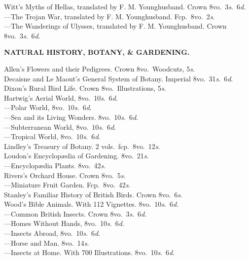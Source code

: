 \documentclass[letterpaper,12pt,oneside,openany]{memoir}
\newcommand{\E}{\hspace*{2mm}---\hspace*{2mm}}
\begin{document}
\begin{footnotesize}
Witt's Myths of Hellas, translated by F. M. Younghusband. Crown 8vo.\ 3\textit{s}.\ 6\textit{d}.\\
\E The Trojan War, translated by F. M. Younghusband. Fcp.\ 8vo.\ 2\textit{s}.\\
\E The Wanderings of Ulysses, translated by F. M. Younghusband. Crown 8vo.\ 3\textit{s}.\ 6\textit{d}.
\begin{center}
\textbf{NATURAL HISTORY, BOTANY, \& GARDENING.}
\end{center}
Allen's Flowers and their Pedigrees. Crown 8vo.\ Woodcuts, 5\textit{s}.\\
Decaisne and Le Maout's General System of Botany. Imperial 8vo.\ 31\textit{s}.\ 6\textit{d}.\\
Dixon's Rural Bird Life. Crown 8vo.\ Illustrations, 5\textit{s}.\\
Hartwig's Aerial World, 8vo.\ 10\textit{s}.\ 6\textit{d}.\\
\E  Polar World, 8vo.\ 10\textit{s}.\ 6\textit{d}.\\
\E  Sea and its Living Wonders. 8vo.\ 10\textit{s}.\ 6\textit{d}.\\
\E  Subterranean World, 8vo.\ 10\textit{s}.\ 6\textit{d}.\\
\E  Tropical World, 8vo.\ 10\textit{s}.\ 6\textit{d}.\\
Lindley's Treasury of Botany. 2 vols.\ fcp.\ 8vo.\ 12\textit{s}.\\
Loudon's Encyclop{\ae}dia of Gardening. 8vo.\ 21\textit{s}.\\
\E Encyclop{\ae}dia Plants. 8vo.\ 42\textit{s}.\\
Rivers's Orchard House. Crown 8vo.\ 5\textit{s}.\\
\E Miniature Fruit Garden. Fcp.\ 8vo.\ 42\textit{s}.\\
Stanley's Familiar History of British Birds. Crown 8vo.\ 6\textit{s}.\\
Wood's Bible Animals. With 112 Vignettes. 8vo.\ 10\textit{s}.\ 6\textit{d}.\\
\E Common British Insects. Crown 8vo.\ 3\textit{s}.\ 6\textit{d}.\\
\E Homes Without Hands, 8vo.\ 10\textit{s}.\ 6\textit{d}.\\
\E Insects Abroad, 8vo.\ 10\textit{s}.\ 6\textit{d}.\\
\E Horse and Man.  8vo.\ 14\textit{s}.\\
\E Insects at Home. With 700 Illustrations. 8vo.\ 10\textit{s}.\ 6\textit{d}.\\

\end{footnotesize}
\end{document}
